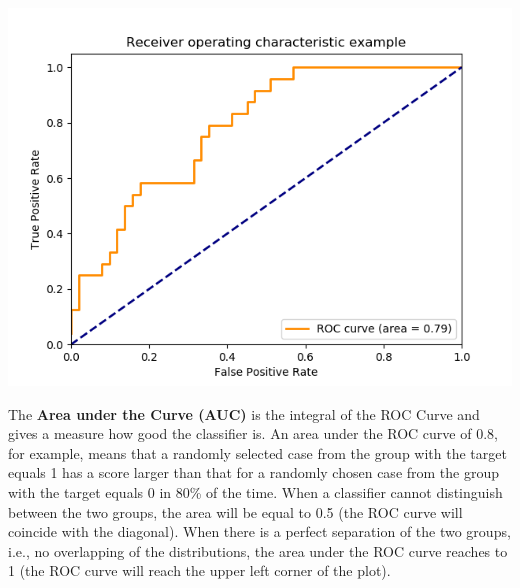 \documentclass[english]{latex4ei/latex4ei_sheet}
\begin{document}
\begin{sectionbox}
\begin{center}
	    \includegraphics[width = 0.9\columnwidth]{figures/sphx_glr_plot_roc_001.png}
	\end{center}
The \textbf{Area under the Curve (AUC)} is the integral of the ROC Curve and gives a measure how good the classifier is. An area under the ROC curve of 0.8, for example, means that a randomly selected case from the group with the target equals 1 has a score larger than that for a randomly chosen case from the group with the target equals 0 in 80\% of the time. When a classifier cannot distinguish between the two groups, the area will be equal to 0.5 (the ROC curve will coincide with the diagonal). When there is a perfect separation of the two groups, i.e., no overlapping of the distributions, the area under the ROC curve reaches to 1 (the ROC curve will reach the upper left corner of the plot). 


\end{sectionbox}
\end{document}
